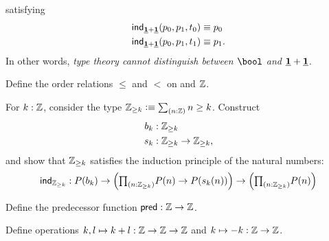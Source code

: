 \begin{exercises}
satisfying
\begin{align*}
\mathsf{ind}_{\underline{\mathbf{1}}+\underline{\mathbf{1}}}(p_0,p_1,t_0) & \equiv p_0 \\
\mathsf{ind}_{\underline{\mathbf{1}}+\underline{\mathbf{1}}}(p_0,p_1,t_1) & \equiv p_1.
\end{align*}
In other words, \emph{type theory cannot distinguish between $\bool$ and $\underline{\mathbf{1}}+\underline{\mathbf{1}}$.}
\item \label{ex:int_order}
\begin{subexenum}
\item Define the order relations $\leq$ and $<$ on and $\mathbb{Z}$.
\item For $k:\mathbb{Z}$, consider the type $\Z_{\geq k}\defeq \sm{n:\Z}n\geq k$. Construct
\begin{align*}
b_k & : \mathbb{Z}_{\geq k} \\
s_k & : \mathbb{Z}_{\geq k}\to\mathbb{Z}_{\geq k},
\end{align*}
and show that $\mathbb{Z}_{\geq k}$ satisfies the induction principle of the natural numbers:
\begin{equation*}
\ind{\Z_{\geq k}} : P(b_k)\to \Big(\prd{n:\Z_{\geq k}} P(n)\to P(s_k(n))\Big)\to \Big(\prd{n:\Z_{\geq k}} P(n)\Big)
\end{equation*}
\end{subexenum}
\item \label{ex:int_pred}Define the predecessor function $\mathsf{pred}:\mathbb{Z}\to \mathbb{Z}$.
\item \label{ex:int_group_ops}Define operations $k,l\mapsto k+l:\mathbb{Z}\to\mathbb{Z}\to\mathbb{Z}$ and $k\mapsto -k:\mathbb{Z}\to \mathbb{Z}$.
\end{exercises}
